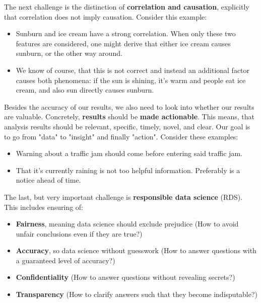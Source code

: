 The next challenge is the distinction of \textbf{correlation and causation}, explicitly that correlation does not imply causation. Consider this example:
\begin{itemize}
  \item Sunburn and ice cream have a strong correlation. When only these two features are considered, one might derive that either ice cream causes sunburn, or the other way around.
  \item We know of course, that this is not correct and instead an additional factor causes both phenomena: if the sun is shining, it's warm and people eat ice cream, and also sun directly causes sunburn.
\end{itemize}

Besides the accuracy of our results, we also need to look into whether our results are valuable. Concretely, \textbf{results} should be \textbf{made actionable}. This means, that analysis results should be relevant, specific, timely, novel, and clear. Our goal is to go from "data" to "insight" and finally "action". Consider these examples:
\begin{itemize}
  \item Warning about a traffic jam should come before entering said traffic jam.
  \item That it's currently raining is not too helpful information. Preferably is a notice ahead of time.
\end{itemize}

The last, but very important challenge is \textbf{responsible data science} (RDS). This includes ensuring of:
\begin{itemize}
  \item \textbf{Fairness}, meaning data science should exclude prejudice {\color{gray}\footnotesize(How to avoid unfair conclusions even if they are true?)}
  \item \textbf{Accuracy}, so data science without guesswork {\color{gray}\footnotesize(How to answer questions with a guaranteed level of accuracy?)}
  \item \textbf{Confidentiality} {\color{gray}\footnotesize(How to answer questions without revealing secrets?)}
  \item \textbf{Transparency} {\color{gray}\footnotesize(How to clarify answers such that they become indisputable?)}
\end{itemize}